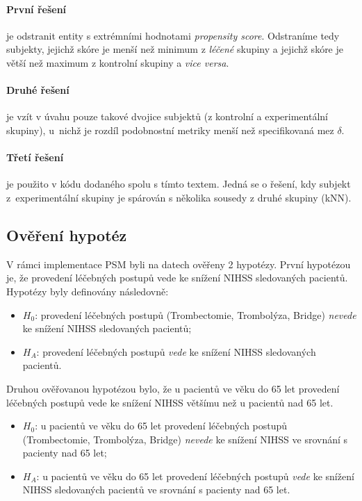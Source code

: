 \paragraph{První řešení}

je odstranit entity s extrémními hodnotami \textit{propensity score}.
Odstraníme tedy subjekty, jejichž skóre je menší než minimum z \textit{léčené} skupiny a jejichž skóre je větší než maximum z kontrolní skupiny a \textit{vice versa}.

\paragraph{Druhé řešení}

je vzít v úvahu pouze takové dvojice subjektů (z kontrolní a experimentální skupiny), u~nichž je rozdíl podobnostní metriky menší než specifikovaná mez \( \delta \).

\paragraph{Třetí řešení}

je použito v kódu dodaného spolu s tímto textem.
Jedná se o řešení, kdy subjekt z~experimentální skupiny je spárován s několika sousedy z druhé skupiny (kNN).

\subsection{Ověření hypotéz}

V rámci implementace PSM byli na datech ověřeny 2 hypotézy.
První hypotézou je, že provedení léčebných postupů vede ke snížení NIHSS sledovaných pacientů.
Hypotézy byly definovány následovně:

\begin{itemize}
    \item $H_0$: provedení léčebných postupů (Trombectomie, Trombolýza, Bridge) \textit{nevede} ke snížení NIHSS sledovaných pacientů;
    \item $H_A$: provedení léčebných postupů \textit{vede} ke snížení NIHSS sledovaných pacientů.
\end{itemize}

Druhou ověřovanou hypotézou bylo, že u pacientů ve věku do 65 let provedení léčebných postupů vede ke snížení NIHSS většímu než u pacientů nad 65 let.

\begin{itemize}
    \item $H_0$: u pacientů ve věku do 65 let provedení léčebných postupů (Trombectomie, Trombolýza, Bridge) \textit{nevede} ke snížení NIHSS ve srovnání s pacienty nad 65 let;
    \item $H_A$: u pacientů ve věku do 65 let provedení léčebných postupů \textit{vede} ke snížení NIHSS sledovaných pacientů ve srovnání s pacienty nad 65 let.
\end{itemize}

